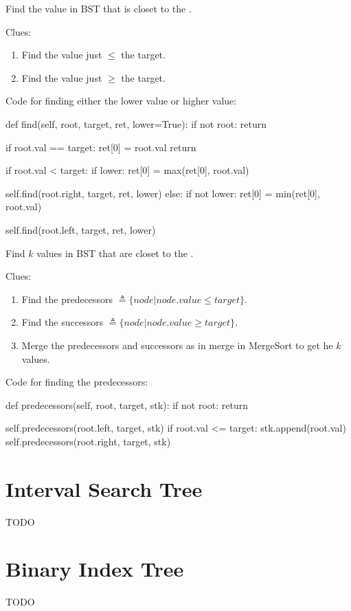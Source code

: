  Find the value in BST that is closet to the .

Clues:
\begin{enumerate}
\item Find the value just $\leq$ the target.
\item Find the value just $\geq$ the target.
\end{enumerate}

Code for finding either the lower value or higher value:
\begin{python}
def find(self, root, target, ret, lower=True):
  if not root:
    return

  if root.val == target:
    ret[0] = root.val
    return

  if root.val < target:
    if lower:
      ret[0] = max(ret[0], root.val)

    self.find(root.right, target, ret, lower)
  else:
    if not lower:
      ret[0] = min(ret[0], root.val)

    self.find(root.left, target, ret, lower)
\end{python}

 Find $k$ values in BST that are closet to the .

Clues:
\begin{enumerate}
\item Find the predecessors $\triangleq \{node | node.value \leq target\}$.
\item Find the successors $\triangleq \{node | node.value \geq target\}$.
\item Merge the predecessors and successors as in merge in MergeSort to get he $k$ values. 
\end{enumerate}

Code for finding the predecessors:
\begin{python}
def predecessors(self, root, target, stk):
  if not root:
    return

  self.predecessors(root.left, target, stk)
  if root.val <= target:
    stk.append(root.val)
    self.predecessors(root.right, target, stk)
\end{python}

\section{Interval Search Tree}
TODO


\section{Binary Index Tree}
TODO


